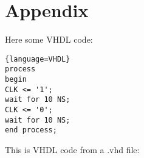 \noindent \section{Appendix} \vspace{-9mm} \hrulefill %

\indent \lipsum[1-2] %

Here some VHDL code:
\begin{lstlisting}{language=VHDL}
process
begin
CLK <= '1'; 
wait for 10 NS;
CLK <= '0'; 
wait for 10 NS;
end process;
\end{lstlisting}

This is VHDL code from a .vhd file:




